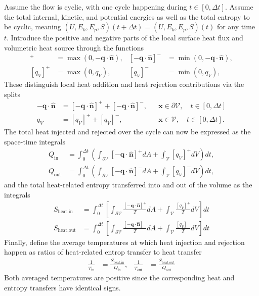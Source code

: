 Assume the flow is cyclic, with one cycle happening during $t\in[0,\Delta t]$. Assume the total internal, kinetic, and potential energies as well as the total entropy to be cyclic, meaning $(U,E_k,E_p,S)(t+\Delta t)=(U,E_k,E_p,S)(t)$ for any time $t$. Introduce the positive and negative parts of the local surface heat flux and volumetric heat source through the functions
\begin{align}
    [-\bm{q}\cdot\bm{\hat{n}}]^{+}&=\max(0,-\bm{q}\cdot\bm{\hat{n}}), & 
    [-\bm{q}\cdot\bm{\hat{n}}]^{-}&=\min(0,-\bm{q}\cdot\bm{\hat{n}}),\\
    [q_V]^{+}&=\max(0,q_V), &
    [q_V]^{-}&=\min(0,q_V),
\end{align}
These distinguish local heat addition and heat rejection contributions via the splits
\begin{align}
    -\bm{q}\cdot\bm{\hat{n}}&=[-\bm{q}\cdot\bm{\hat{n}}]^{+}+[-\bm{q}\cdot\bm{\hat{n}}]^{-}, & &\bm{x}\in\partial\mathcal{V},\quad t\in[0,\Delta t]\\
    q_V&=[q_V]^{+}+[q_V]^{-}, & &\bm{x}\in\mathcal{V},\quad t\in[0,\Delta t].
\end{align}
The total heat injected and rejected over the cycle can now be expressed as the space-time integrals
\begin{align}
    Q_\text{in}&=\int_0^{\Delta t}\left(\int_{\partial\mathcal{V}}[-\bm{q}\cdot\bm{\hat{n}}]^{+}dA+\int_{\mathcal{V}}[q_V]^{+}dV\right)dt,\\
    Q_\text{out}&=\int_0^{\Delta t}\left(\int_{\partial\mathcal{V}}[-\bm{q}\cdot\bm{\hat{n}}]^{-}dA+\int_{\mathcal{V}}[q_V]^{-}dV\right)dt,
\end{align}
and the total heat-related entropy transferred into and out of the volume as the integrals
\begin{align}
    S_\text{heat,in}&=\int_0^{\Delta t}\left[\int_{\partial\mathcal{V}}\frac{[-\bm{q}\cdot\bm{\hat{n}}]^{+}}{T}dA+\int_{\mathcal{V}}\frac{[q_V]^{+}}{T}dV\right]dt\\
    S_\text{heat,out}&=\int_0^{\Delta t}\left[\int_{\partial\mathcal{V}}\frac{[-\bm{q}\cdot\bm{\hat{n}}]^{-}}{T}dA+\int_{\mathcal{V}}\frac{[q_V]^{-}}{T}dV\right]dt
\end{align}
Finally, define the average temperatures at which heat injection and rejection happen as ratios of heat-related entrop transfer to heat transfer
\begin{align}
    \frac{1}{\bar{T}_\text{in}}&=\frac{S_\text{heat,in}}{Q_\text{in}}, & 
    \frac{1}{\bar{T}_\text{out}}&=\frac{S_\text{heat,out}}{Q_\text{out}}
\end{align}
Both averaged temperatures are positive since the corresponding heat and entropy transfers have identical signs.

